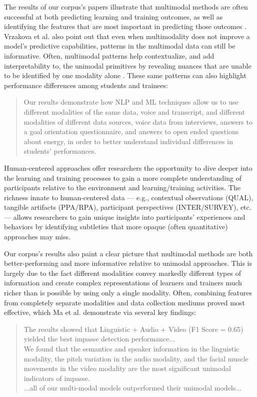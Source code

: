 \documentclass[manuscript,screen,review]{acmart}
\begin{document}
The results of our corpus's papers illustrate that multimodal methods are often successful at both predicting learning and training outcomes, as well as identifying the features that are most important in predicting those outcomes \cite{3339002981,1637690235,3783339081}. Vrzakova et al. also point out that even when multimodality does not improve a model's predictive capabilities, patterns in the multimodal data can still be informative. Often, multimodal patterns help contextualize, and add interpretability to, the unimodal primitives by revealing nuances that are unable to be identified by one modality alone \cite{1770989706}. These same patterns can also highlight performance differences among students and trainees:

\begin{quote}
    Our results demonstrate how NLP and ML techniques allow us to use different modalities of the same data, voice and transcript, and different modalities of different data sources, voice data from interviews, answers to a goal orientation questionnaire, and answers to open ended questions about energy, in order to better understand individual differences in students’ performances. \cite{32184286}
\end{quote}

Human-centered approaches offer researchers the opportunity to dive deeper into the learning and training processes to gain a more complete understanding of participants relative to the environment and learning/training activities. The richness innate to human-centered data --- e.g., contextual observations (QUAL), tangible artifacts (PPA/RPA), participant perspectives (INTER/SURVEY), etc. --- allows researchers to gain unique insights into participants' experiences and behaviors by identifying subtleties that more opaque (often quantitative) approaches may miss. 

Our corpus's results also paint a clear picture that multimodal methods are both better-performing and more informative relative to unimodal approaches. This is largely due to the fact different modalities convey markedly different types of information and create complex representations of learners and trainers much richer than is possible by using only a single modality. Often, combining features from completely separate modalities and data collection mediums proved most effective, which Ma et al. \cite{3754172825} demonstrate via several key findings:

\begin{quote}
    The results showed that Linguistic + Audio + Video (F1 Score = 0.65) yielded the best impasse detection performance...\\

    We found that the semantics and speaker information in the linguistic modality, the pitch variation in the audio modality, and the facial muscle movements in the video modality are the most significant unimodal indicators of impasse.\\

    ...all of our multi-modal models outperformed their unimodal models...
\end{quote}
\end{document}

